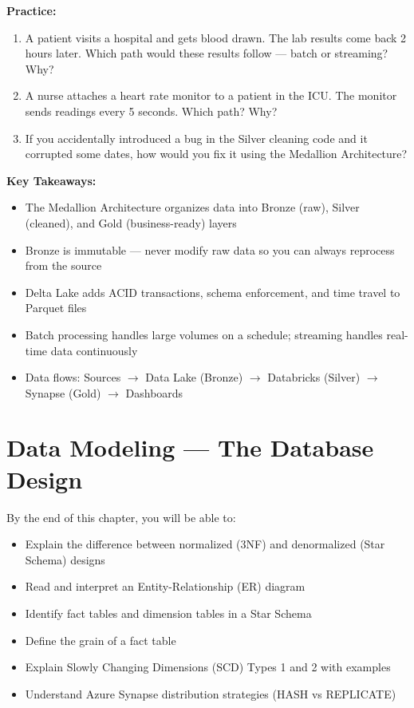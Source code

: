 \documentclass[12pt, a4paper, oneside]{report}
\begin{document}
\begin{exercisebox}
\textbf{Practice:}
\begin{enumerate}
    \item A patient visits a hospital and gets blood drawn. The lab results come back 2 hours later. Which path would these results follow --- batch or streaming? Why?
    \item A nurse attaches a heart rate monitor to a patient in the ICU. The monitor sends readings every 5 seconds. Which path? Why?
    \item If you accidentally introduced a bug in the Silver cleaning code and it corrupted some dates, how would you fix it using the Medallion Architecture?
\end{enumerate}
\end{exercisebox}

\begin{summarybox}
\textbf{Key Takeaways:}
\begin{itemize}
    \item The Medallion Architecture organizes data into Bronze (raw), Silver (cleaned), and Gold (business-ready) layers
    \item Bronze is immutable --- never modify raw data so you can always reprocess from the source
    \item Delta Lake adds ACID transactions, schema enforcement, and time travel to Parquet files
    \item Batch processing handles large volumes on a schedule; streaming handles real-time data continuously
    \item Data flows: Sources $\rightarrow$ Data Lake (Bronze) $\rightarrow$ Databricks (Silver) $\rightarrow$ Synapse (Gold) $\rightarrow$ Dashboards
\end{itemize}
\end{summarybox}


\chapter{Data Modeling --- The Database Design}
\label{ch:datamodel}

\begin{objectivebox}
By the end of this chapter, you will be able to:
\begin{itemize}
    \item Explain the difference between normalized (3NF) and denormalized (Star Schema) designs
    \item Read and interpret an Entity-Relationship (ER) diagram
    \item Identify fact tables and dimension tables in a Star Schema
    \item Define the grain of a fact table
    \item Explain Slowly Changing Dimensions (SCD) Types 1 and 2 with examples
    \item Understand Azure Synapse distribution strategies (HASH vs REPLICATE)
\end{itemize}
\end{objectivebox}
\end{document}
